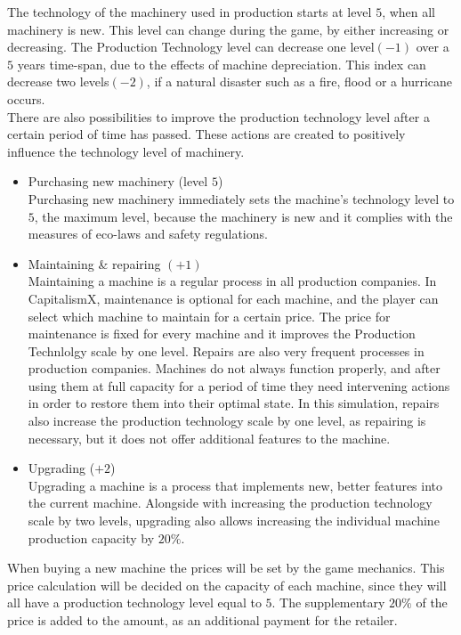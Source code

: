 The technology of the machinery used in production starts at level $5$, when all machinery is new. This level can change during the game, by either increasing or decreasing. The Production Technology level can decrease one level$(-1)$ over a $5$ years time-span, due to the effects of machine depreciation. This index can decrease two levels$(-2)$, if a natural disaster such as a fire, flood or a hurricane occurs.\\
There are also possibilities to improve the production technology level after a certain period of time has passed. These actions are created to  positively influence the technology level of machinery.
\begin{itemize}
    \item Purchasing new machinery (level $5$) \\
		Purchasing new machinery immediately sets the machine's technology level to $5$, the maximum level, because the machinery is new and it complies with the measures of eco-laws and safety regulations.
\item Maintaining \& repairing $(+1)$ \\
Maintaining a machine is a regular process in all production companies. In CapitalismX, maintenance is optional for each machine, and the player can select which machine to maintain for a certain price. The price for maintenance is fixed for every machine and it improves the Production Technlolgy scale by one level. 
Repairs are also very frequent processes in production companies. Machines do not always function properly, and after using them at full capacity for a period of time they need intervening actions in order to restore them into their optimal state. In this simulation, repairs also increase the production technology scale by one level, as repairing is necessary, but it does not offer additional features to the machine.
\item Upgrading ($+2$) \\
Upgrading a machine is a process that implements new, better features into the current machine. Alongside with increasing the production technology scale by two levels, upgrading also allows increasing the individual machine production capacity by $20\%$.
\end{itemize}
When buying a new machine the prices will be set by the game mechanics. This price calculation will be decided on the capacity of each machine, since they will all have a production technology level equal to $5$. The supplementary $20\%$ of the price is added to the amount, as an additional payment for the retailer.
